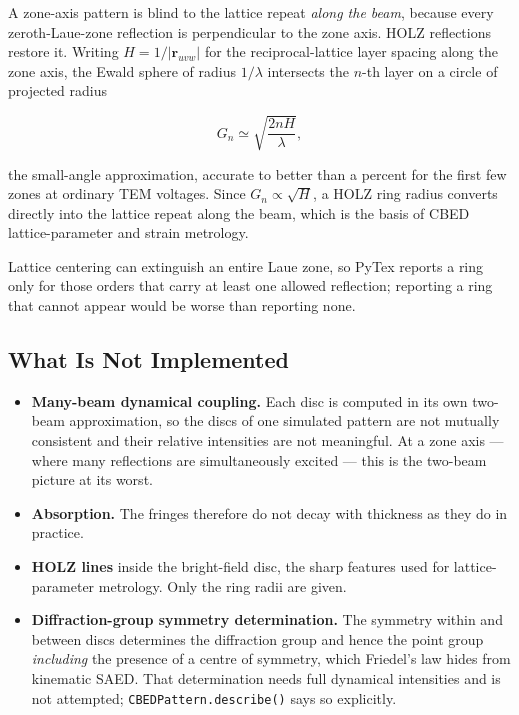 A zone-axis pattern is blind to the lattice repeat \emph{along the beam}, because every
zeroth-Laue-zone reflection is perpendicular to the zone axis. HOLZ reflections restore it.
Writing \(H = 1/|\mathbf{r}_{uvw}|\) for the reciprocal-lattice layer spacing along the zone
axis, the Ewald sphere of radius \(1/\lambda\) intersects the \(n\)-th layer on a circle of
projected radius

\begin{equation}
  G_{n} \simeq \sqrt{\frac{2nH}{\lambda}},
  \label{eq:holz}
\end{equation}

the small-angle approximation, accurate to better than a percent for the first few zones at
ordinary TEM voltages. Since \(G_n \propto \sqrt{H}\), a HOLZ ring radius converts directly
into the lattice repeat along the beam, which is the basis of CBED lattice-parameter and
strain metrology.

Lattice centering can extinguish an entire Laue zone, so PyTex reports a ring only for those
orders that carry at least one allowed reflection; reporting a ring that cannot appear would
be worse than reporting none.

\subsection{What Is Not Implemented}

\begin{itemize}
  \item \textbf{Many-beam dynamical coupling.} Each disc is computed in its own two-beam
        approximation, so the discs of one simulated pattern are not mutually consistent and
        their relative intensities are not meaningful. At a zone axis --- where many
        reflections are simultaneously excited --- this is the two-beam picture at its worst.
  \item \textbf{Absorption.} The fringes therefore do not decay with thickness as they do in
        practice.
  \item \textbf{HOLZ lines} inside the bright-field disc, the sharp features used for
        lattice-parameter metrology. Only the ring radii are given.
  \item \textbf{Diffraction-group symmetry determination.} The symmetry within and between
        discs determines the diffraction group and hence the point group \emph{including} the
        presence of a centre of symmetry, which Friedel's law hides from kinematic SAED. That
        determination needs full dynamical intensities and is not attempted;
        \texttt{CBEDPattern.describe()} says so explicitly.
\end{itemize}

